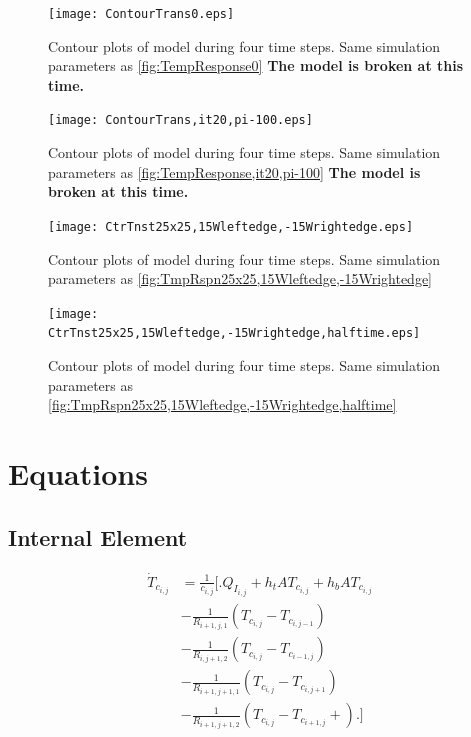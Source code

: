 \documentclass[10pt,twocolumn]{article}
\begin{document}
\begin{figure}
	\center
	\texttt{[image: ContourTrans0.eps]}
	\caption{Contour plots of model during four time steps. Same simulation parameters as \autoref{fig:TempResponse0} \textbf{The model is broken at this time.}}
	\label{fig:ContourTrans0}
\end{figure}


\begin{figure}
	\center
	\texttt{[image: ContourTrans,it20,pi-100.eps]}
	\caption{Contour plots of model during four time steps. Same simulation parameters as \autoref{fig:TempResponse,it20,pi-100} \textbf{The model is broken at this time.}}
	\label{fig:ContourTrans,it20,pi-100}
\end{figure}


\begin{figure}
	\center
	\texttt{[image: CtrTnst25x25,15Wleftedge,-15Wrightedge.eps]}
	\caption{Contour plots of model during four time steps. Same simulation parameters as \autoref{fig:TmpRspn25x25,15Wleftedge,-15Wrightedge}}
	\label{fig:CtrTnst25x25,15Wleftedge,-15Wrightedge}
\end{figure}


\begin{figure}
	\center
	\texttt{[image: CtrTnst25x25,15Wleftedge,-15Wrightedge,halftime.eps]}
	\caption{Contour plots of model during four time steps. Same simulation parameters as \autoref{fig:TmpRspn25x25,15Wleftedge,-15Wrightedge,halftime}}
	\label{fig:CtrTnst25x25,15Wleftedge,-15Wrightedge,halftime}
\end{figure}

\twocolumn
\section{Equations}
\subsection{Internal Element}
\begin{equation}
\begin{split}
\dot{T}_{c_{i,j}} 	& = \frac{1}{c_{i,j}}
					\Biggl[\Biggr.
					 	Q_{I_{i,j}} + h_{t}AT_{c_{i,j}} + h_{b}AT_{c_{i,j}} \\					
					&	- \frac{1}{R_{i+1,j,1}}\left(T_{c_{i,j}}- T_{c_{i,j-1}}\right) \\
					& 	- \frac{1}{R_{i,j+1,2}}\left(T_{c_{i,j}}- T_{c_{i-1,j}}\right) \\
					& 	- \frac{1}{R_{i+1,j+1,1}}\left(T_{c_{i,j}}- T_{c_{i,j+1}}\right) \\
					& 	- \frac{1}{R_{i+1,j+1,2}}\left(T_{c_{i,j}}- T_{c_{i+1,j}} + \right)
					\Biggl.\Biggl]
\end{split}
\end{equation}
\end{document}
